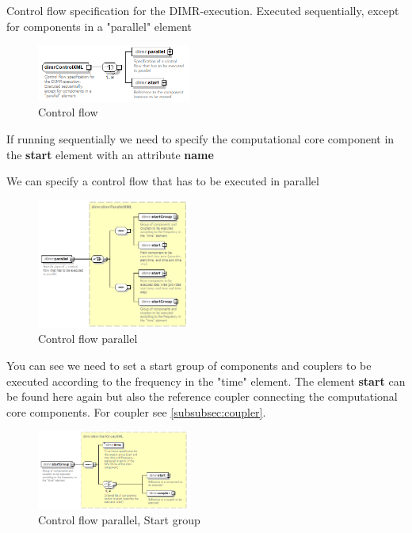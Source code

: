 \documentclass[signature]{deltares_manual}
\begin{document}
Control flow specification for the DIMR-execution. Executed sequentially, except for components in a "parallel" element

\begin{figure}[H]
	\centering
	\includegraphics[width=0.45\textwidth] {pictures/dimr_diagrams/dimr_p11.png}
	\caption{Control flow} 
	\label{fig:dimrControl}
\end{figure}

If running sequentially we need to specify the computational core component in the \textbf{start} element with an attribute \textbf{name}

We can specify a control flow that has to be executed in parallel
\begin{figure}[H]
	\centering
	\includegraphics[width=0.45\textwidth] {pictures/dimr_diagrams/dimr_p12.png}
	\caption{Control flow parallel} 
	\label{fig:dimrControlParallel}
\end{figure}

You can see we need to set a start group of components and couplers to be executed according to the frequency in the "time" element. The element \textbf{start} can be found here again but also the reference coupler connecting the computational core components. For coupler see \autoref{subsubsec:coupler}.

\begin{figure}[H]
	\centering
	\includegraphics[width=0.45\textwidth] {pictures/dimr_diagrams/dimr_p33.png}
	\caption{Control flow parallel, Start group} 
	\label{fig:dimrControlParallelStartGroup}
\end{figure}
\end{document}
